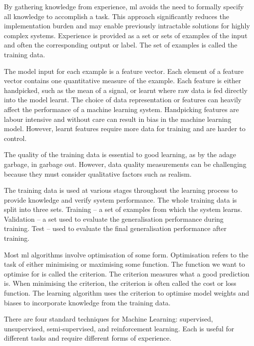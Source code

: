 By gathering knowledge from experience, \acrshort{ml} avoids the need to formally specify all knowledge to accomplish a task\cite{Goodfellow2015}. This approach significantly reduces the implementation burden and may enable previously intractable solutions for highly complex systems. Experience is provided as a set or sets of examples of the input and often the corresponding output or label. The set of examples is called the training data.

The model input for each example is a feature vector. Each element of a feature vector contains one quantitative measure of the example. Each feature is either handpicked, such as the mean of a signal, or learnt where raw data is fed directly into the model learnt. The choice of data representation or features can heavily affect the performance of a machine learning system. Handpicking features are labour intensive and without care can result in bias in the machine learning model. However, learnt features require more data for training and are harder to control.\cite{Bengio2013}

The quality of the training data is essential to good learning, as by the adage garbage, in garbage out. However, data quality measurements can be challenging because they must consider qualitative factors such as realism.

The training data is used at various stages throughout the learning process to provide knowledge and verify system performance. The whole training data is split into three sets. Training – a set of examples from which the system learns. Validation – a set used to evaluate the generalisation performance during training. Test – used to evaluate the final generalisation performance after training. 

Most \acrshort{ml} algorithms involve optimisation of some form. Optimisation refers to the task of either minimising or maximising some function. The function we want to optimise for is called the criterion. The criterion measures what a good prediction is. When minimising the criterion, the criterion is often called the cost or loss function.\cite{Goodfellow2015} The learning algorithm uses the criterion to optimise model weights and biases to incorporate knowledge from the training data.

There are four standard techniques for Machine Learning: supervised, unsupervised, semi-supervised, and reinforcement learning. Each is useful for different tasks and require different forms of experience.

